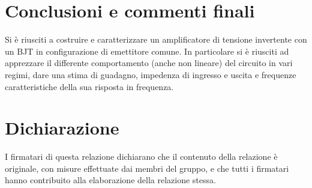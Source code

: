 \documentclass[10pt,a4paper]{article}
\begin{document}
\section*{Conclusioni e commenti finali}
Si è riusciti a costruire e caratterizzare un amplificatore di tensione
invertente con un BJT in configurazione di emettitore comune. In particolare
si è riusciti ad apprezzare il differente comportamento (anche non lineare)
del circuito in vari regimi, dare una stima di guadagno, impedenza di
ingresso e uscita e frequenze caratteristiche della sua risposta in frequenza.

\section*{Dichiarazione}
I firmatari di questa relazione dichiarano che il contenuto della relazione \`e
originale, con misure effettuate dai membri del gruppo, e che tutti i firmatari
hanno contribuito alla elaborazione della relazione stessa.
\end{document}
